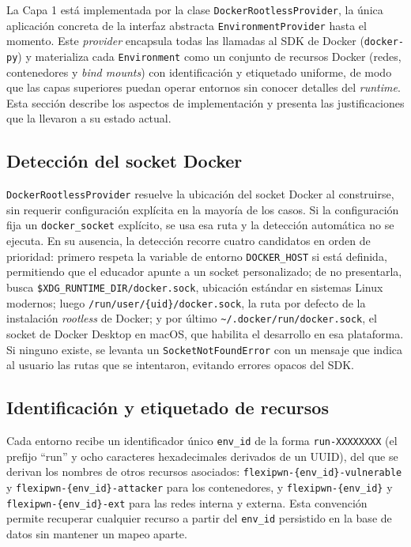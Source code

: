 La Capa 1 está implementada por la clase \texttt{DockerRootlessProvider}, la
única aplicación concreta de la interfaz abstracta \texttt{EnvironmentProvider}
hasta el momento. Este
\textit{provider} encapsula todas las llamadas al SDK de Docker
(\texttt{docker-py}) y materializa cada \texttt{Environment} como un conjunto de
recursos Docker (redes, contenedores y \textit{bind mounts}) con identificación
y etiquetado uniforme, de modo que las capas superiores puedan operar entornos
sin conocer detalles del \textit{runtime}. Esta sección describe los aspectos de
implementación y presenta las justificaciones que la llevaron a su estado
actual.

\subsection{Detección del socket Docker}

\begin{sloppypar}
\texttt{DockerRootlessProvider} resuelve la ubicación del socket Docker al
construirse, sin requerir configuración explícita en la mayoría de los casos. Si
la configuración fija un \texttt{docker\_socket} explícito, se usa esa ruta y la
detección automática no se ejecuta. En su ausencia, la detección recorre cuatro
candidatos en orden de prioridad: primero respeta la variable de entorno
\texttt{DOCKER\_HOST} si está definida, permitiendo que el educador apunte a un
socket personalizado; de no presentarla, busca
\texttt{\$XDG\_RUNTIME\_DIR/docker.sock}, ubicación estándar en sistemas Linux
modernos; luego \texttt{/run/user/\{uid\}/docker.sock}, la ruta por defecto de
la instalación \textit{rootless} de Docker; y por último
\texttt{\textasciitilde/.docker/run/docker.sock}, el socket de Docker Desktop en
macOS, que habilita el desarrollo en esa plataforma. Si ninguno existe, se
levanta un \texttt{SocketNotFoundError} con un mensaje que indica al usuario las
rutas que se intentaron, evitando errores opacos del SDK.
\end{sloppypar}

\subsection{Identificación y etiquetado de recursos}
\begin{sloppypar}
Cada entorno recibe un identificador único \texttt{env\_id} de la forma
\texttt{run-XXXXXXXX} (el prefijo ``run'' y ocho caracteres hexadecimales
derivados de un UUID), del que se derivan los nombres de otros recursos
asociados: \texttt{flexipwn-\{env\_id\}-vulnerable} y
\texttt{flexipwn-\{env\_id\}-attacker} para los contenedores, y
\texttt{flexipwn-\{env\_id\}} y \texttt{flexipwn-\{env\_id\}-ext} para las redes
interna y externa. Esta convención permite recuperar cualquier recurso a partir
del \texttt{env\_id} persistido en la base de datos sin mantener un mapeo
aparte.
\end{sloppypar}

